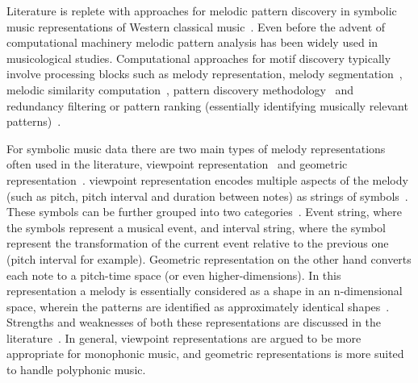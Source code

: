 Literature is replete with approaches for melodic pattern discovery in symbolic music representations of Western classical music~\citep{cambouropoulos1997towards,meredith2006point,conklin2001representation,Lartillot2005b}. Even before the advent of computational machinery melodic pattern analysis has been widely used in musicological studies. Computational approaches for motif discovery typically involve processing blocks such as melody representation\citep{meredith2006point}, melody segmentation~\citep{Cambouropoulos2006}, melodic similarity computation~\citep{Cambouropoulos2001,Marsden2012}, pattern discovery methodology~\citep{collins2013siarct,meredith2002algorithms} and redundancy filtering or pattern ranking (essentially identifying musically relevant patterns)~\citep{Lartillot2005,conklin2010discovery}. 

For symbolic music data there are two main types of melody representations often used in the literature, viewpoint representation~\citep{conklin1995multiple} and geometric representation~\citep{meredith2002algorithms}. viewpoint representation encodes multiple aspects of the melody (such as pitch, pitch interval and duration between notes) as strings of symbols~\citep{conklin2001representation}. These symbols can be further grouped into two categories~\citep{meredith2002algorithms}. Event string, where the symbols represent a musical event, and interval string, where the symbol represent the transformation of the current event relative to the previous one (pitch interval for example). Geometric representation on the other hand converts each note to a pitch-time space (or even higher-dimensions). In this representation a melody is essentially considered as a shape in an n-dimensional space, wherein the patterns are identified as approximately identical shapes~\citep{meredith2002algorithms}. Strengths and weaknesses of both these representations are discussed in the literature~\cite{Cambouropoulos2009,meredith2002algorithms}. In general, viewpoint representations are argued to be more appropriate for monophonic music, and geometric representations is more suited to handle polyphonic music. 

